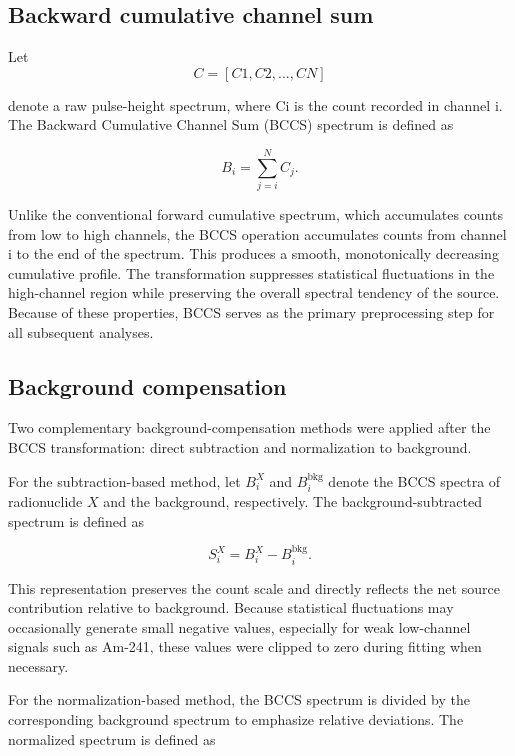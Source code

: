 \documentclass[fleqn, 10pt]{wlscirep}
\begin{document}
\subsection*{Backward cumulative channel sum}

Let
\begin{equation}
C =[C1,C2,...,CN ] 
\end{equation}

denote a raw pulse-height spectrum, where Ci is the count recorded in channel i. The Backward Cumulative Channel Sum (BCCS) spectrum is defined as

\begin{equation}
    B_i = \sum_{j=i}^N C_j.
\end{equation}

Unlike the conventional forward cumulative spectrum, which accumulates counts from low to high channels, the BCCS operation accumulates counts from channel i to the end of the spectrum. This produces a smooth, monotonically decreasing cumulative profile. The transformation suppresses statistical fluctuations in the high-channel region while preserving the overall spectral tendency of the source. Because of these properties, BCCS serves as the primary preprocessing step for all subsequent analyses.


\subsection*{Background compensation}

Two complementary background-compensation methods were applied after the BCCS transformation: direct subtraction and normalization to background.

For the subtraction-based method, let $B^X_i$ and $B^\text{bkg}_i$ denote the BCCS spectra of radionuclide $X$ and the background, respectively. The background-subtracted spectrum is defined as

\begin{equation}
S^X_i = B^X_i - B^\text{bkg}_i.
\end{equation}

This representation preserves the count scale and directly reflects the net source contribution relative to background. Because statistical fluctuations may occasionally generate small negative values, especially for weak low-channel signals such as Am-241, these values were clipped to zero during fitting when necessary. 

For the normalization-based method, the BCCS spectrum is divided by the corresponding background spectrum to emphasize relative deviations. The normalized spectrum is defined as
\end{document}
